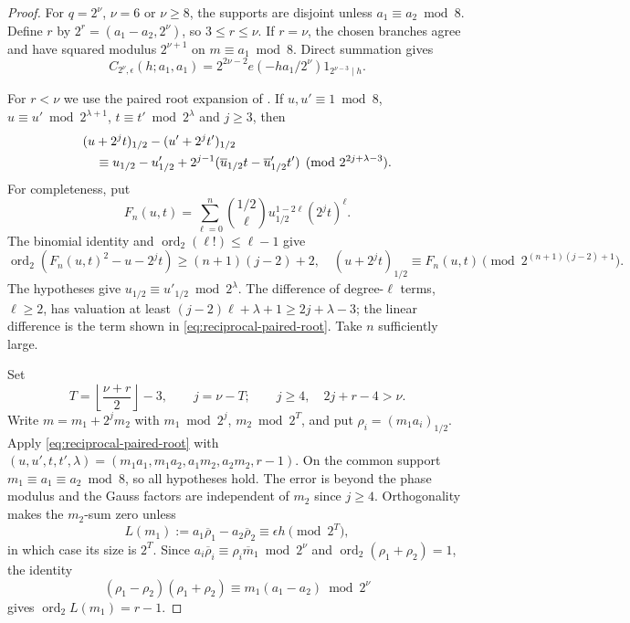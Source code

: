 \documentclass[12pt, a4paper]{amsart}
\numberwithin{equation}{section}
\newcommand{\e}{e}
\renewcommand{\bar}[1]{\overline{#1}}
\renewcommand{\le}{\leqslant}
\renewcommand{\ge}{\geqslant}
\theoremstyle{plain}
\begin{document}
\begin{proof}
For $q=2^\nu$, $\nu=6$ or $\nu\ge8$, the supports are disjoint unless $a_1\equiv a_2\bmod8$. Define $r$ by $2^{r}=(a_1-a_2,2^\nu)$, so $3\le r\le\nu$. If $r=\nu$, the chosen branches agree and have squared modulus $2^{\nu+1}$ on $m\equiv a_1\bmod8$. Direct summation gives
\begin{equation}\label{eq:reciprocal-two-diagonal-endpoint}
 C_{2^\nu,\epsilon}(h;a_1,a_1)
 =2^{2\nu-2}\e(-ha_1/2^\nu)
   1_{2^{\nu-3}\mid h}.
\end{equation}

For $r<\nu$ we use the paired root expansion of \cite[Lemma~3.2]{MQW}. If $u,u'\equiv1\bmod8$, $u\equiv u'\bmod {2^{\lambda+1}}$, $t\equiv t'\bmod {2^{\lambda}}$ and $j\ge3$, then
\begin{align}\label{eq:reciprocal-paired-root}
 &(u+2^jt)_{1/2}-(u'+2^jt')_{1/2}\notag\\
 &\quad\equiv u_{1/2}-u'_{1/2}
 +2^{j-1}(\bar u_{1/2}t-\bar u'_{1/2}t')
 \pmod{2^{2j+\lambda-3}}.
\end{align}
For completeness, put
$$
F_n(u,t)=\sum_{\ell=0}^n\binom{1/2}{\ell}u_{1/2}^{1-2\ell}(2^jt)^\ell.
$$
  The binomial identity and $\operatorname{ord}_2(\ell!)\le\ell-1$ give
$$
 \operatorname{ord}_2(F_n(u,t)^2-u-2^jt)\ge(n+1)(j-2)+2,\quad
 (u+2^jt)_{1/2}\equiv F_n(u,t)\pmod{2^{(n+1)(j-2)+1}}.
$$
The hypotheses give $u_{1/2}\equiv u'_{1/2}\bmod {2^{\lambda}}$. The difference of degree-$\ell$ terms, $\ell\ge2$, has valuation at least $(j-2)\ell+\lambda+1\ge2j+\lambda-3$; the linear difference is the term shown in \eqref{eq:reciprocal-paired-root}. Take $n$ sufficiently large.

Set
\begin{equation}\label{eq:reciprocal-two-Tj}
 T=\left\lfloor\frac{\nu+r}{2}\right\rfloor-3,
 \qquad j=\nu-T;\qquad j\ge4,\quad 2j+r-4>\nu.
\end{equation}
Write $m=m_1+2^{j}m_2$ with $m_1\bmod2^{j}$, $m_2\bmod2^{T}$, and put $\rho_i=(m_1a_i)_{1/2}$. Apply \eqref{eq:reciprocal-paired-root} with $(u,u',t,t',\lambda)=(m_1a_1,m_1a_2,a_1m_2,a_2m_2,r-1)$. On the common support $m_1\equiv a_1\equiv a_2\bmod8$, so all hypotheses hold. The error is beyond the phase modulus and the Gauss factors are independent of $m_2$ since $j\ge4$. Orthogonality makes the $m_2$-sum zero unless
\begin{equation}\label{eq:reciprocal-two-orthogonality}
 L(m_1):=a_1\bar\rho_1-a_2\bar\rho_2
 \equiv\epsilon h\pmod{2^{T}},
\end{equation}
in which case its size is $2^{T}$. Since $a_i\bar\rho_i\equiv \rho_i\bar m_1\bmod {2^\nu}$ and $\operatorname{ord}_2(\rho_1+\rho_2)=1$, the identity
$$
(\rho_1-\rho_2)(\rho_1+\rho_2)\equiv m_1(a_1-a_2)\bmod {2^\nu}
$$
gives $\operatorname{ord}_2L(m_1)=r-1$.


\end{proof}
\end{document}
